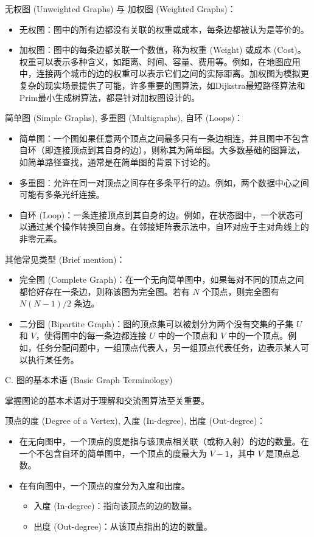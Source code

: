 无权图 (Unweighted Graphs) 与 加权图 (Weighted Graphs)：

\begin{itemize}
	\item 无权图：图中的所有边都没有关联的权重或成本，每条边都被认为是等价的。
	\item 加权图：图中的每条边都关联一个数值，称为权重 (Weight) 或成本 (Cost)。权重可以表示多种含义，如距离、时间、容量、费用等。例如，在地图应用中，连接两个城市的边的权重可以表示它们之间的实际距离。加权图为模拟更复杂的现实场景提供了可能，许多重要的图算法，如Dijkstra最短路径算法和Prim最小生成树算法，都是针对加权图设计的。
\end{itemize}

简单图 (Simple Graphs), 多重图 (Multigraphs), 自环 (Loops)：

\begin{itemize}
	\item 简单图：一个图如果任意两个顶点之间最多只有一条边相连，并且图中不包含自环（即连接顶点到其自身的边），则称其为简单图。大多数基础的图算法，如简单路径查找，通常是在简单图的背景下讨论的。
	\item 多重图：允许在同一对顶点之间存在多条平行的边。例如，两个数据中心之间可能有多条光纤连接。
	\item 自环 (Loop)：一条连接顶点到其自身的边。例如，在状态图中，一个状态可以通过某个操作转换回自身。在邻接矩阵表示法中，自环对应于主对角线上的非零元素。
\end{itemize}

其他常见类型 (Brief mention)：

\begin{itemize}
	\item 完全图 (Complete Graph)：在一个无向简单图中，如果每对不同的顶点之间都恰好存在一条边，则称该图为完全图。若有 $N$ 个顶点，则完全图有 $N(N-1)/2$ 条边。
	\item 二分图 (Bipartite Graph)：图的顶点集可以被划分为两个没有交集的子集 $U$ 和 $V$，使得图中的每一条边都连接 $U$ 中的一个顶点和 $V$ 中的一个顶点。例如，任务分配问题中，一组顶点代表人，另一组顶点代表任务，边表示某人可以执行某任务。
\end{itemize}

C. 图的基本术语 (Basic Graph Terminology)

掌握图论的基本术语对于理解和交流图算法至关重要。

顶点的度 (Degree of a Vertex), 入度 (In-degree), 出度 (Out-degree)：

\begin{itemize}
	\item 在无向图中，一个顶点的度是指与该顶点相关联（或称入射）的边的数量。在一个不包含自环的简单图中，一个顶点的度最大为 $V-1$，其中 $V$ 是顶点总数。
	\item 在有向图中，一个顶点的度分为入度和出度。
	\begin{itemize}
		\item 入度 (In-degree)：指向该顶点的边的数量。
		\item 出度 (Out-degree)：从该顶点指出的边的数量。
	\end{itemize}
\end{itemize}

